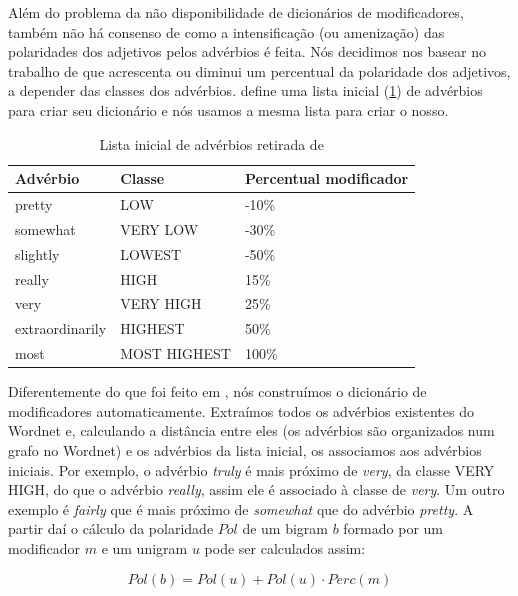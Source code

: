 Além do problema da não disponibilidade de dicionários de modificadores, também não há consenso de como a intensificação (ou amenização) das polaridades dos adjetivos pelos advérbios é feita. Nós decidimos nos basear no trabalho de \cite{taboada2011lexicon} que acrescenta ou diminui um percentual da polaridade dos adjetivos, a depender das classes dos advérbios.  define uma lista inicial (\ref{table:adv_seed}) de advérbios para criar seu dicionário e nós usamos a mesma lista para criar o nosso.

\begin{table}[!h]
	\centering
    \begin{tabular}{lll}
    Advérbio         				& Classe          & Percentual modificador \\ \hline
    pretty                   			& LOW 			   & -10\% \\
    somewhat                   	& VERY LOW  & -30\% \\
    slightly                   		& LOWEST 	   & -50\% \\
    really                   			& HIGH 			   & 15\% \\
    very                   			& VERY HIGH &  25\% \\
    extraordinarily             & HIGHEST 	   & 50\% \\
    most                   			& MOST HIGHEST & 100\% \\
    \end{tabular}
    \caption{Lista inicial de advérbios retirada de \cite{taboada2011lexicon}}
	\label{table:adv_seed}
\end{table}

Diferentemente do que foi feito em , nós construímos o dicionário de modificadores automaticamente. Extraímos todos os advérbios existentes do Wordnet e, calculando a distância entre eles (os advérbios são organizados num grafo no Wordnet) e os advérbios da lista inicial, os associamos aos advérbios iniciais. Por exemplo, o advérbio \textit{truly} é mais próximo de \textit{very}, da classe VERY HIGH, do que o advérbio \textit{really}, assim ele é associado à classe de \textit{very}. Um outro exemplo é \textit{fairly} que é mais próximo de \textit{somewhat} que do advérbio \textit{pretty}. A partir daí o cálculo da polaridade $Pol$ de um bigram $b$ formado por um modificador $m$ e um unigram $u$ pode ser calculados assim: 

\begin{equation}
Pol(b) = Pol(u) + Pol(u) \cdot Perc(m)
\label{eq:pol_bigrams}
\end{equation}

